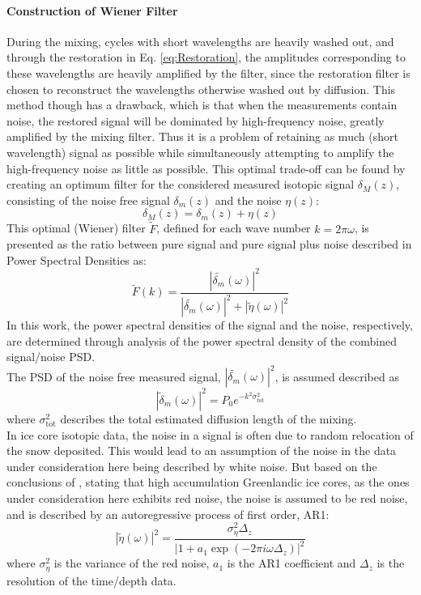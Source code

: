 \documentclass[../../CompleteThesis2/Complete_2ndDraft]{subfiles}
\begin{document}
\paragraph{Construction of Wiener Filter} During the mixing, cycles with short wavelengths are heavily washed out, and through the restoration in Eq. \ref{eq:Restoration}, the amplitudes corresponding to these wavelengths are heavily amplified by the filter, since the restoration filter is chosen to reconstruct the wavelengths otherwise washed out by diffusion. This method though has a drawback, which is that when the measurements contain noise, the restored signal will be dominated by high-frequency noise, greatly amplified by the mixing filter. Thus it is a problem of retaining as much (short wavelength) signal as possible while simultaneously attempting to amplify the high-frequency noise as little as possible. This optimal trade-off can be found by creating an optimum filter for the considered measured isotopic signal $\delta_M(z)$, consisting of the noise free signal $\delta_m(z)$ and the noise $\eta(z)$:
\begin{equation}
	\delta_M(z) = \delta_m (z) + \eta(z)
\end{equation} 
This optimal (Wiener) filter $\tilde{F}$, defined for each wave number $k = 2\pi \omega$, is presented as the ratio between pure signal and pure signal plus noise described in Power Spectral Densities as:
\begin{equation}
	\tilde{F}(k) =\frac{|\tilde{\delta_m}(\omega)|^2}{|\tilde{\delta_m}(\omega)|^2 + |\tilde{\eta}(\omega)|^2}
	\label{eq:WienerFilter}
\end{equation}
In this work, the power spectral densities of the signal and the noise, respectively, are determined through analysis of the power spectral density of the combined signal/noise PSD.\\
The PSD of the noise free measured signal, $|\tilde{\delta_m}(\omega)|^2$, is assumed described as 
\begin{equation}
	|\tilde{\delta}_m(\omega)|^2 = P_0 e^{-k^2 \sigma_{\text{tot}}^2}
	\label{eq:SignalPSD}
\end{equation}
where $\sigma_{\text{tot}}^2$ describes the total estimated diffusion length of the mixing. \\
In ice core isotopic data, the noise in a signal is often due to random relocation of the snow deposited. This would lead to an assumption of the noise in the data under consideration here being described by white noise. But based on the conclusions of \cite[C. Holme et al., 2018]{Holme2018}, stating that high accumulation Greenlandic ice cores, as the ones under consideration here exhibits red noise, the noise is assumed to be red noise, and is described by an autoregressive process of first order, AR1:
\begin{equation}
	|\tilde{\eta}(\omega)|^2 = \frac{\sigma_{\eta}^2 \Delta_z}{|1 + a_1 \exp(-2\pi i \omega \Delta_z)|^2}
	\label{eq:NoisePSD}
\end{equation}
where $\sigma_{\eta}^2$ is the variance of the red noise, $a_1$ is the AR1 coefficient and $\Delta_z$ is the resolution of the time/depth data.
\end{document}
